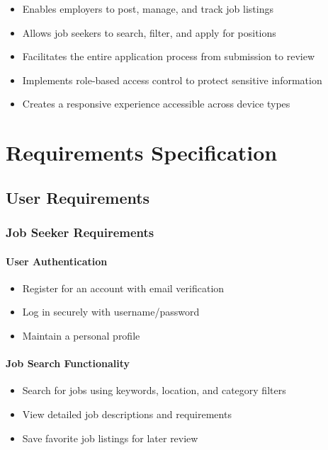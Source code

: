 \documentclass[12pt,a4paper]{article}
\begin{document}
\begin{itemize}
    \item Enables employers to post, manage, and track job listings
    \item Allows job seekers to search, filter, and apply for positions
    \item Facilitates the entire application process from submission to review
    \item Implements role-based access control to protect sensitive information
    \item Creates a responsive experience accessible across device types
\end{itemize}

\section{Requirements Specification}

\subsection{User Requirements}

\subsubsection{Job Seeker Requirements}

\paragraph{User Authentication}
\begin{itemize}
    \item Register for an account with email verification
    \item Log in securely with username/password 
    \item Maintain a personal profile
\end{itemize}

\paragraph{Job Search Functionality}
\begin{itemize}
    \item Search for jobs using keywords, location, and category filters
    \item View detailed job descriptions and requirements
    \item Save favorite job listings for later review
\end{itemize}
\end{document}
